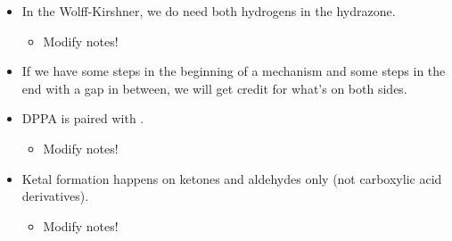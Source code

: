 \documentclass[../notes.tex]{subfiles}
\begin{document}
\begin{itemize}
\begin{itemize}
    \end{itemize}
    \item In the Wolff-Kirshner, we do need both hydrogens in the hydrazone.
    \begin{itemize}
        \item Modify notes!
    \end{itemize}
    \item If we have some steps in the beginning of a mechanism and some steps in the end with a gap in between, we will get credit for what's on both sides.
    \item DPPA is paired with .
    \begin{itemize}
        \item Modify notes!
    \end{itemize}
    \item Ketal formation happens on ketones and aldehydes only (not carboxylic acid derivatives).
    \begin{itemize}
        \item Modify notes!
    \end{itemize}
\end{itemize}
\end{document}
